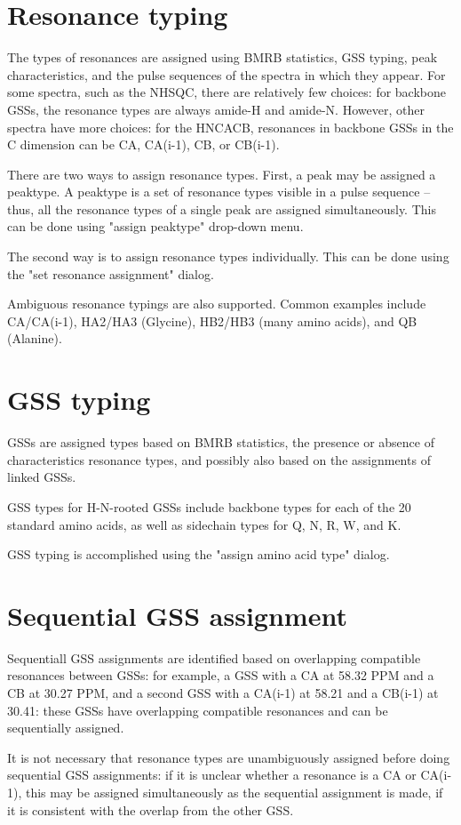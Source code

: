 \documentclass[11pt,a4paper]{article}
\begin{document}
\section{Resonance typing}
The types of resonances are assigned using BMRB statistics, GSS typing, 
peak characteristics,
and the pulse sequences of the spectra in which they appear.  For some spectra,
such as the NHSQC, there are relatively few choices: for backbone GSSs,
the resonance types are always amide-H and amide-N.  However, other spectra
have more choices: for the HNCACB, resonances in backbone GSSs in the C
dimension can be CA, CA(i-1), CB, or CB(i-1).

There are two ways to assign resonance types.  First, a peak may be assigned
a peaktype.  A peaktype is a set of resonance types visible in a pulse sequence
-- thus, all the resonance types of a single peak are assigned simultaneously.
This can be done using "assign peaktype" drop-down menu.

The second way is to assign resonance types individually.  This can be done 
using the "set resonance assignment" dialog.

Ambiguous resonance typings are also supported.  Common examples include
CA/CA(i-1), HA2/HA3 (Glycine), HB2/HB3 (many amino acids), and QB (Alanine).


\section{GSS typing}
GSSs are assigned types based on BMRB statistics, the presence or absence of
characteristics resonance types, and possibly also based on the assignments 
of linked GSSs.

GSS types for H-N-rooted GSSs include backbone types for each of the 20 
standard amino acids, as well as sidechain types for Q, N, R, W, and K.

GSS typing is accomplished using the "assign amino acid type" dialog.


\section{Sequential GSS assignment}
Sequentiall GSS assignments are identified based on overlapping compatible
resonances between GSSs: for example, a GSS with a CA at 58.32 PPM and a CB
at 30.27 PPM, and a second GSS with a CA(i-1) at 58.21 and a CB(i-1) at 30.41:
these GSSs have overlapping compatible resonances and can be sequentially
assigned.

It is not necessary that resonance types are unambiguously assigned before
doing sequential GSS assignments: if it is unclear whether a resonance is a
CA or CA(i-1), this may be assigned simultaneously as the sequential assignment
is made, if it is consistent with the overlap from the other GSS.
\end{document}
